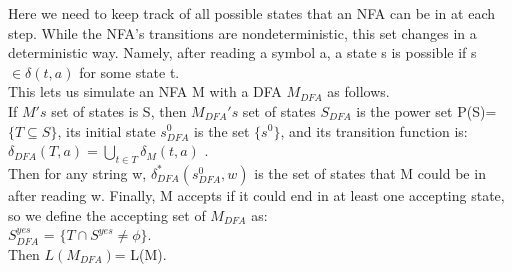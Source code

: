 \documentclass[11pt]{article}
\begin{document}
\begin{flushleft}
\null
Here we need to keep track of all possible states that an NFA can be in at each step. While the NFA’s transitions
are nondeterministic, this set changes in a deterministic way. Namely, after reading a symbol a, a state s is possible if s $\in \delta(t ,a)$ for some state t.\\
This lets us simulate an NFA M with a DFA $M_{DFA}$ as follows. \\
If $M's$ set of states is S, then $M_{DFA}'s$ set of states $S_{DFA}$ is the power set P(S)= $\{T \subseteq S\}$, its initial state $s_{DFA}^0$ is the set $\{s^0\}$, and its transition function is:\\
$\delta_{DFA}(T,a)= \bigcup_ {t \in T} \delta_M(t ,a)$ .\\
Then for any string w, $\delta_{DFA}^*(s_{DFA}^0,w)$ is the set of states that M could be in after reading w. Finally, M accepts if it could end in at least one accepting state, so we define the accepting set of $M_{DFA}$ as: \\
$S_{DFA}^{yes}$ = $\{T \cap S^{yes} \neq \phi\}$. \\
Then $L(M_{DFA})$= L(M).


\end{flushleft}
\end{document}

